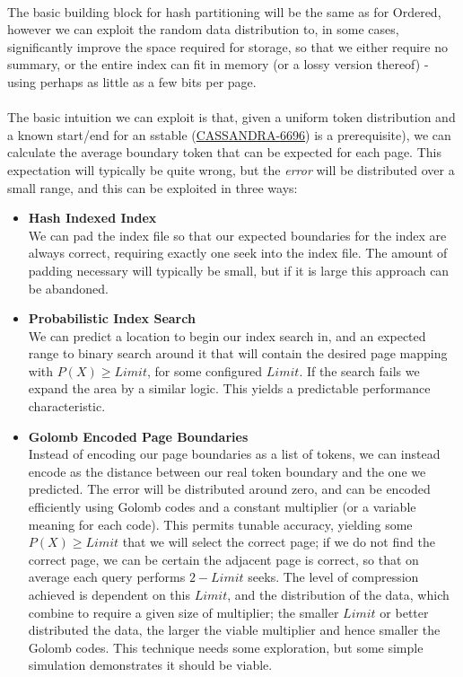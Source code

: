 \documentclass[fleqn]{article}
\begin{document}
\paragraph{}
    The basic building block for hash partitioning will be the same as for Ordered, however we can exploit
    the random data distribution to, in some cases, significantly improve the space required for storage, 
    so that we either require no summary, or the entire index can fit in memory (or a lossy version thereof)
     - using perhaps as little as a few bits per page.
    \\\\
    The basic intuition we can exploit is that, given a uniform token distribution and a known start/end 
    for an sstable (\href{https://issues.apache.org/jira/browse/CASSANDRA-6696}{CASSANDRA-6696}) is a prerequisite),
    we can calculate the average boundary token that can be expected for each page. This
    expectation will typically be quite wrong, but the \textit{error} will be distributed over a small 
    range, and this can be exploited in three ways:

    \begin{itemize}
      \item{\textbf{Hash Indexed Index}}\\[2pt]
        We can pad the index file so that our expected boundaries for the index are always correct,
        requiring exactly one seek into the index file. The amount of padding necessary will typically
        be small, but if it is large this approach can be abandoned.
      \item{\textbf{Probabilistic Index Search}}\\[2pt]
        We can predict a location to begin our index search in, and an expected range to binary search around
        it that will contain the desired page mapping with $P(X) \geq Limit$, for some configured $Limit$. 
        If the search fails we expand the area by a similar logic. This yields a predictable performance
        characteristic.
      \item{\textbf{Golomb Encoded Page Boundaries}}\\[2pt]
        Instead of encoding our page boundaries as a list of tokens, we can instead encode as the distance 
        between our real token boundary and the one we predicted. The error will be distributed around zero,
        and can be encoded efficiently using Golomb codes and a constant multiplier (or a variable meaning
        for each code). This permits tunable accuracy, yielding some $P(X) \geq Limit$ that we will select
        the correct page; if we do not find the correct page, we can be certain the adjacent page is correct,
        so that on average each query performs $2-Limit$ seeks. The level of compression achieved is dependent
        on this $Limit$, and the distribution of the data, which combine to require a given size of multiplier;
        the smaller $Limit$ or better distributed the data, the larger the viable multiplier and hence smaller
        the Golomb codes. This technique needs some exploration, but some simple simulation demonstrates it
        should be viable.
    \end{itemize}
\end{document}
